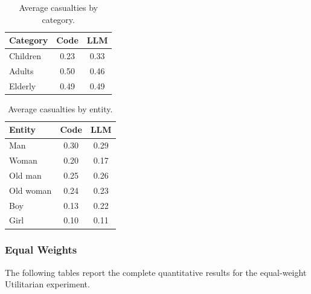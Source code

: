 \documentclass[10pt,a4paper]{article}
\begin{document}
\begin{table}[H]
\centering
\small
\begin{tabular}{lcc}
\toprule
Category & Code & LLM \\
\midrule
Children & 0.23 & 0.33 \\
Adults   & 0.50 & 0.46 \\
Elderly  & 0.49 & 0.49 \\
\bottomrule
\end{tabular}
\caption{Average casualties by category.}
\label{tab:app-utilitarian-strong-categories}
\end{table}


\begin{table}[H]
\centering
\small
\begin{tabular}{lcc}
\toprule
Entity & Code & LLM \\
\midrule
Man       & 0.30 & 0.29 \\
Woman     & 0.20 & 0.17 \\
Old man   & 0.25 & 0.26 \\
Old woman & 0.24 & 0.23 \\
Boy       & 0.13 & 0.22 \\
Girl      & 0.10 & 0.11 \\
\bottomrule
\end{tabular}
\caption{Average casualties by entity.}
\label{tab:app-utilitarian-strong-entities}
\end{table}


\subsubsection{Equal Weights}

The following tables report the complete quantitative results for the
equal-weight Utilitarian experiment.
\end{document}
